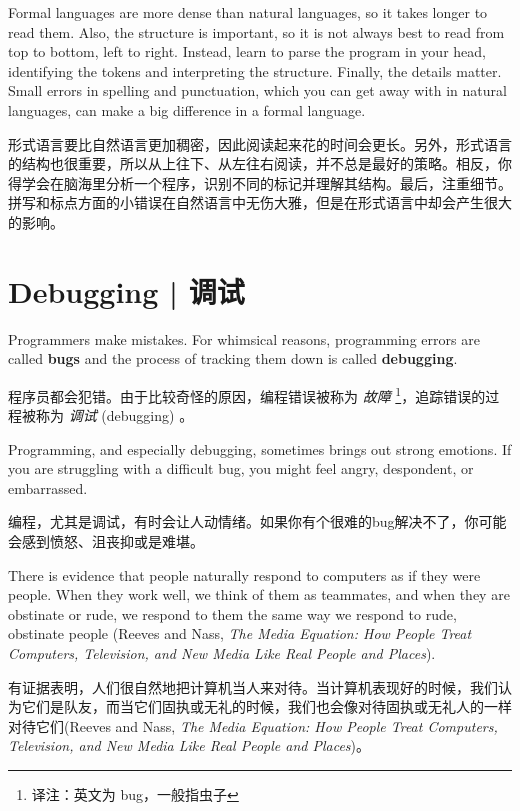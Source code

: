 Formal languages are more dense
than natural languages, so it takes longer to read them.  Also, the
structure is important, so it is not always best to read
from top to bottom, left to right.  Instead, learn to parse the
program in your head, identifying the tokens and interpreting the
structure.  Finally, the details matter.  Small errors in
spelling and punctuation, which you can get away
with in natural languages, can make a big difference in a formal
language.

形式语言要比自然语言更加稠密，因此阅读起来花的时间会更长。另外，形式语言的结构也很重要，所以从上往下、从左往右阅读，并不总是最好的策略。相反，你得学会在脑海里分析一个程序，识别不同的标记并理解其结构。最后，注重细节。拼写和标点方面的小错误在自然语言中无伤大雅，但是在形式语言中却会产生很大的影响。

\section{Debugging  |  调试}

Programmers make mistakes.  For whimsical reasons, programming errors
are called {\bf bugs} and the process of tracking them down is called
{\bf debugging}.

程序员都会犯错。由于比较奇怪的原因，编程错误被称为 \emph{故障} \footnote{译注：英文为 bug，一般指虫子}，追踪错误的过程被称为 \emph{调试} (debugging) 。

  

Programming, and especially debugging, sometimes brings out strong
emotions.  If you are struggling with a difficult bug, you might
feel angry, despondent, or embarrassed.

编程，尤其是调试，有时会让人动情绪。如果你有个很难的bug解决不了，你可能会感到愤怒、沮丧抑或是难堪。

There is evidence that people naturally respond to computers as if
they were people.  When they work well, we think
of them as teammates, and when they are obstinate or rude, we
respond to them the same way we respond to rude,
obstinate people (Reeves and Nass, {\it The Media
    Equation: How People Treat Computers, Television, and New Media
    Like Real People and Places}).

有证据表明，人们很自然地把计算机当人来对待。当计算机表现好的时候，我们认为它们是队友，而当它们固执或无礼的时候，我们也会像对待固执或无礼人的一样对待它们(Reeves and Nass, {\it The Media Equation: How People Treat Computers, Television, and New Media Like Real People and Places})。
  

